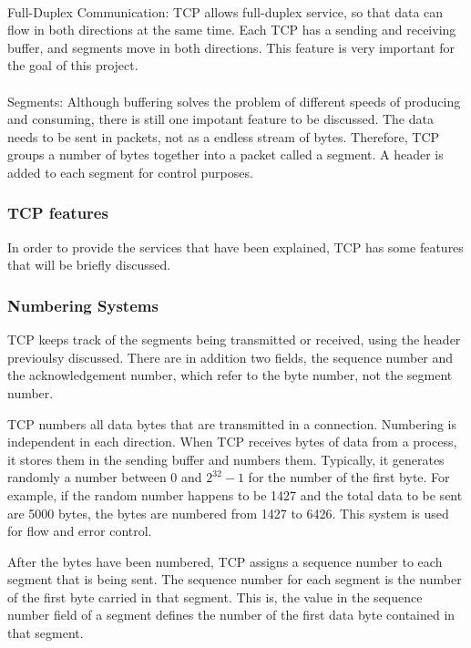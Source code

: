 \paragraph{}
Full-Duplex Communication: TCP allows full-duplex service, so that data can flow in both directions at the same time. Each TCP has a sending and receiving buffer, and segments move in both directions. This feature is very important for the goal of this project.

\paragraph{}
Segments: Although buffering solves the problem of different speeds of producing and consuming, there is still one impotant feature to be discussed. The data needs to be sent in packets, not as a endless stream of bytes. Therefore, TCP groups a number of bytes together into a packet called a segment. A header is added to each segment for control purposes. 

\subsubsection{TCP features}
In order to provide the services that have been explained, TCP has some features that will be briefly discussed.

\subsubsection*{Numbering Systems}
TCP keeps track of the segments being transmitted or received, using the header previoulsy discussed. 
There are in addition two fields, the sequence number and the acknowledgement number, which refer to the byte number, not the segment number.

TCP numbers all data bytes that are transmitted in a connection. Numbering is independent in each direction. When TCP receives bytes of data from a process, it stores them in the sending buffer and numbers them. Typically, it generates randomly a number between 0 and $2^{32}-1$ for the number of the first byte. For example, if the random number happens to be 1427 and the total data to be sent are 5000 bytes, the bytes are numbered from 1427 to 6426. This system is used for flow and error control.

After the bytes have been numbered, TCP assigns a sequence number to each segment that is being sent. The sequence number for each segment is the number of the first byte carried in that segment. This is, the value in the sequence number field of a segment defines the number of the first data byte contained in that segment. 

